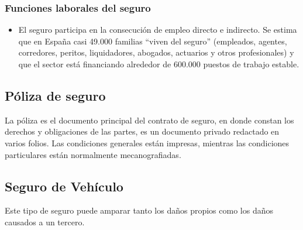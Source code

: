 \subsubsection{Funciones laborales del seguro}

\begin{itemize}

	\item El seguro participa en la consecución de empleo directo e indirecto. Se estima que en España casi 49.000 familias “viven del seguro” (empleados, agentes, corredores, peritos, liquidadores, abogados, actuarios y otros profesionales) y que el sector está financiando alrededor de 600.000 puestos de trabajo estable.

\end{itemize}

\subsection{Póliza de seguro}
\setlength{\parskip}{5mm}

	La póliza es el documento principal del contrato de seguro, en donde constan los derechos y obligaciones de las partes, es un documento privado redactado en varios folios. Las condiciones generales están impresas, mientras las condiciones particulares están normalmente mecanografiadas. 


\setlength{\parskip}{0mm}


\subsection{Seguro de Vehículo}
\setlength{\parskip}{5mm}

Este tipo de seguro puede amparar tanto los daños propios como los daños causados a un tercero.

